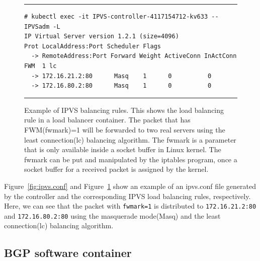 \begin{figure}[h]
  \centering
  \rule{\columnwidth}{0.4pt}
\begin{verbatim}
# kubectl exec -it IPVS-controller-4117154712-kv633 -- IPVSadm -L
IP Virtual Server version 1.2.1 (size=4096)
Prot LocalAddress:Port Scheduler Flags
  -> RemoteAddress:Port Forward Weight ActiveConn InActConn
FWM  1 lc
  -> 172.16.21.2:80      Masq    1      0          0         
  -> 172.16.80.2:80      Masq    1      0          0
\end{verbatim}
\rule{\columnwidth}{0.4pt}

  \par\bigskip
  \centering
  \begin{minipage}{0.9\columnwidth}
    \caption[Example of IPVS balancing rules]{
      Example of IPVS balancing rules.
      This shows the load balancing rule in a load balancer container.
      The packet that has FWM(fwmark)=1 will be forwarded to two real servers using the least connection(lc) balancing algorithm.
      The fwmark is a parameter that is only available inside a socket buffer in Linux kernel.
      The fwmark can be put and manipulated by the iptables program, once a socket buffer for a received packet is assigned by the kernel.
      }
    \label{fig:IPVS rule}
  \end{minipage}
\end{figure}

Figure~\ref{fig:ipvs.conf} and Figure~\ref{fig:IPVS rule} show an example of an ipvs.conf file 
generated by the controller and the corresponding IPVS load balancing rules, respectively.
Here, we can see that the packet with {\tt fwmark=1}\cite{BertHubert2002} is distributed 
to {\tt 172.16.21.2:80} and {\tt 172.16.80.2:80} 
using the masquerade mode(Masq) and 
the least connection(lc)\cite{Zhang2000} balancing algorithm.

\subsection{BGP software container}\label{sec:bgp}

